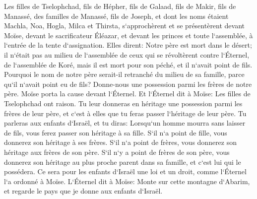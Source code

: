 \verse Les filles de Tselophchad, fils de Hépher, fils de Galaad, fils de Makir, fils de Manassé, des familles de Manassé, fils de Joseph, et dont les noms étaient Machla, Noa, Hogla, Milca et Thirsta, 
\verse s`approchèrent et se présentèrent devant Moïse, devant le sacrificateur Éléazar, et devant les princes et toute l`assemblée, à l`entrée de la tente d`assignation. Elles dirent: 
\verse Notre père est mort dans le désert; il n`était pas au milieu de l`assemblée de ceux qui se révoltèrent contre l`Éternel, de l`assemblée de Koré, mais il est mort pour son péché, et il n`avait point de fils. 
\verse Pourquoi le nom de notre père serait-il retranché du milieu de sa famille, parce qu`il n`avait point eu de fils? Donne-nous une possession parmi les frères de notre père. 
\verse Moïse porta la cause devant l`Éternel. 
\verse Et l`Éternel dit à Moïse: 
\verse Les filles de Tselophchad ont raison. Tu leur donneras en héritage une possession parmi les frères de leur père, et c`est à elles que tu feras passer l`héritage de leur père. 
\verse Tu parleras aux enfants d`Israël, et tu diras: Lorsqu`un homme mourra sans laisser de fils, vous ferez passer son héritage à sa fille. 
\verse S`il n`a point de fille, vous donnerez son héritage à ses frères. 
\verse S`il n`a point de frères, vous donnerez son héritage aux frères de son père. 
\verse S`il n`y a point de frères de son père, vous donnerez son héritage au plus proche parent dans sa famille, et c`est lui qui le possédera. Ce sera pour les enfants d`Israël une loi et un droit, comme l`Éternel l`a ordonné à Moïse. 
\verse L`Éternel dit à Moïse: Monte sur cette montagne d`Abarim, et regarde le pays que je donne aux enfants d`Israël. 

